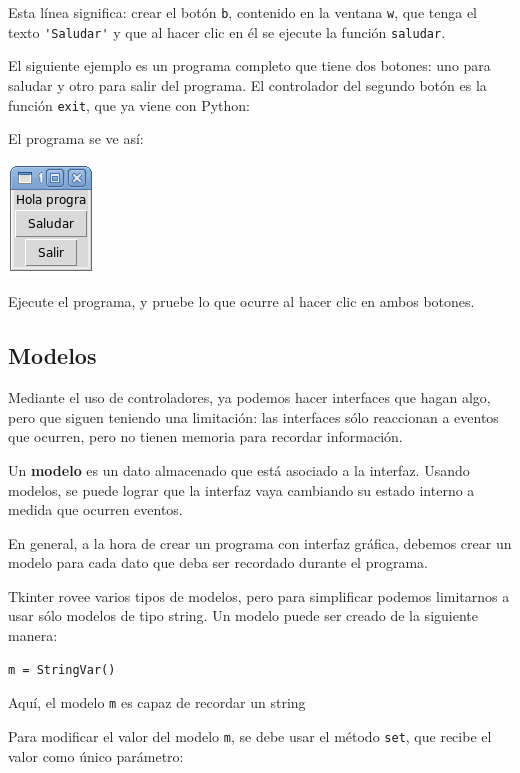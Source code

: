 Esta línea significa: crear el botón \lstinline!b!, contenido en la
ventana \lstinline!w!, que tenga el texto \lstinline!'Saludar'! y que al
hacer clic en él se ejecute la función \lstinline!saludar!.

El siguiente ejemplo es un programa completo que tiene dos botones: uno
para saludar y otro para salir del programa. El controlador del segundo
botón es la función \lstinline!exit!, que ya viene con Python:

El programa se ve así:

\includegraphics{../diapos/programas/tkinter/capturas/04.png}

Ejecute el programa, y pruebe lo que ocurre al hacer clic en ambos
botones.

\subsection{Modelos}

Mediante el uso de controladores, ya podemos hacer interfaces que hagan
algo, pero que siguen teniendo una limitación: las interfaces sólo
reaccionan a eventos que ocurren, pero no tienen memoria para recordar
información.

Un \textbf{modelo} es un dato almacenado que está asociado a la
interfaz. Usando modelos, se puede lograr que la interfaz vaya cambiando
su estado interno a medida que ocurren eventos.

En general, a la hora de crear un programa con interfaz gráfica, debemos
crear un modelo para cada dato que deba ser recordado durante el
programa.

Tkinter rovee varios tipos de modelos, pero para simplificar podemos
limitarnos a usar sólo modelos de tipo string. Un modelo puede ser
creado de la siguiente manera:

\begin{lstlisting}
m = StringVar()
\end{lstlisting}

Aquí, el modelo \lstinline!m! es capaz de recordar un string

Para modificar el valor del modelo \lstinline!m!, se debe usar el método
\lstinline!set!, que recibe el valor como único parámetro:

